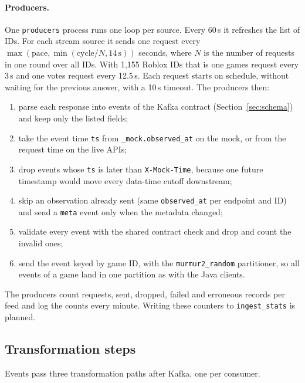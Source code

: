 \documentclass[10pt,a4paper]{article}
\newcommand{\ep}[1]{\texttt{\small #1}}
\begin{document}
\paragraph{Producers.} One \ep{producers} process runs one loop per source. Every 60\,s it refreshes the list of IDs. For each stream source it sends one request every $\max(\text{pace}, \min(\text{cycle}/N, 14\,\text{s}))$ seconds, where $N$ is the number of requests in one round over all IDs. With 1,155 Roblox IDs that is one games request every 3\,s and one votes request every 12.5\,s. Each request starts on schedule, without waiting for the previous answer, with a 10\,s timeout. The producers then:
\begin{enumerate}
  \item parse each response into events of the Kafka contract (Section~\ref{sec:schema}) and keep only the listed fields;
  \item take the event time \ep{ts} from \ep{\_mock.observed\_at} on the mock, or from the request time on the live APIs;
  \item drop events whose \ep{ts} is later than \ep{X-Mock-Time}, because one future timestamp would move every data-time cutoff downstream;
  \item skip an observation already sent (same \ep{observed\_at} per endpoint and ID) and send a \ep{meta} event only when the metadata changed;
  \item validate every event with the shared contract check and drop and count the invalid ones;
  \item send the event keyed by game ID, with the \ep{murmur2\_random} partitioner, so all events of a game land in one partition as with the Java clients.
\end{enumerate}
The producers count requests, sent, dropped, failed and erroneous records per feed and log the counts every minute. Writing these counters to \ep{ingest\_stats} is planned.

\subsection{Transformation steps}\label{sec:transform}
Events pass three transformation paths after Kafka, one per consumer.
\end{document}
